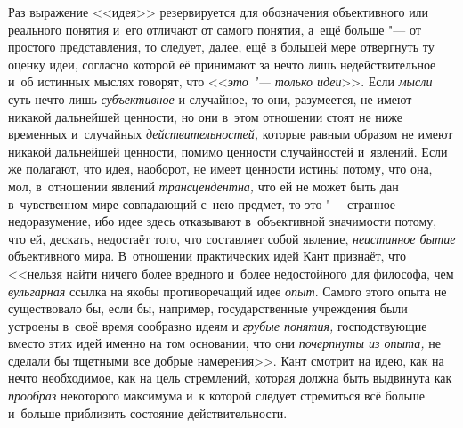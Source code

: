 Раз выражение <<идея>> резервируется для обозначения
объективного или реального понятия и~его отличают от самого понятия, а~ещё
больше "--- от простого представления, то следует, далее, ещё в
большей мере отвергнуть ту оценку идеи, согласно которой её принимают за
нечто лишь недействительное и~об истинных мыслях говорят, что
<<{\em это "--- только
идеи}>>. Если {\em мысли}
суть нечто лишь
{\em субъективное} и
случайное, то они, разумеется, не имеют никакой дальнейшей ценности, но они
в~этом отношении стоят не ниже временных и~случайных
{\em действительностей,}
которые равным образом не имеют никакой дальнейшей ценности,
помимо ценности случайностей и~явлений. Если же полагают, что идея,
наоборот, не имеет ценности истины потому, что она, мол, в~отношении
явлений {\em трансцендентна,}
что ей не может быть дан в~чувственном мире совпадающий с~нею
предмет,
то это "--- странное недоразумение, ибо идее
здесь отказывают в~объективной значимости потому, что ей, дескать,
недостаёт того, что составляет собой явление,
{\em неистинное бытие}
объективного мира. В~отношении практических идей Кант
признаёт, что <<нельзя найти ничего более вредного и~более недостойного для
философа, чем {\em вульгарная}
ссылка на якобы противоречащий идее
{\em опыт}. Самого этого
опыта не существовало бы, если бы, например, государственные учреждения
были устроены в~своё время сообразно идеям и
{\em грубые понятия,} господствующие вместо этих идей именно на том
основании, что они {\em почерпнуты из опыта,} не сделали бы тщетными
все добрые намерения>>.
Кант смотрит на идею, как на нечто необходимое, как на цель
стремлений, которая должна быть выдвинута как
{\em прообраз} некоторого
максимума и~к которой следует стремиться всё больше и~больше приблизить
состояние действительности.

